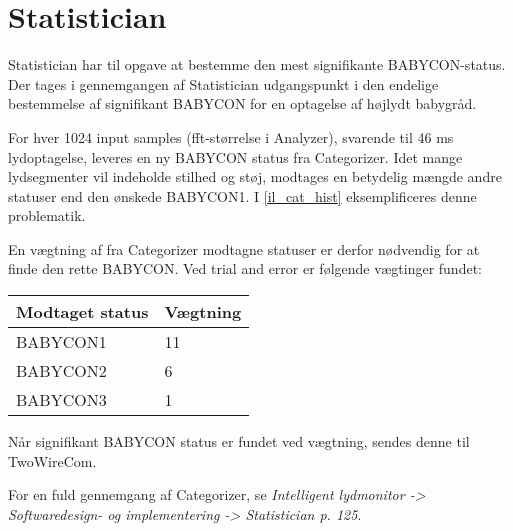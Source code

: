 \section{Statistician}

Statistician har til opgave at bestemme den mest signifikante BABYCON-status. Der tages i gennemgangen af Statistician udgangspunkt i den endelige bestemmelse af signifikant BABYCON for en optagelse af højlydt babygråd.
 
For hver 1024 input samples (fft-størrelse i Analyzer), svarende til 46 ms lydoptagelse, leveres en ny BABYCON status fra Categorizer. Idet mange lydsegmenter vil indeholde stilhed og støj, modtages en betydelig mængde andre statuser end den ønskede BABYCON1. I \ref{il_cat_hist} eksemplificeres denne problematik.


En vægtning af fra Categorizer modtagne statuser er derfor nødvendig for at finde den rette BABYCON. Ved trial and error er følgende vægtinger fundet:
\begin{center}
    \begin{tabular}{ | l | l |}
    \hline
    \textbf{Modtaget status}	& \textbf{Vægtning}		\\ \hline
    BABYCON1							& 11					\\ \hline
    BABYCON2							& 6						\\ \hline
    BABYCON3							& 1						\\ \hline   
    \end{tabular}
\end{center}

Når signifikant BABYCON status er fundet ved vægtning, sendes denne til TwoWireCom.

For en fuld gennemgang af Categorizer, se \textit{Intelligent lydmonitor -> Softwaredesign- og implementering -> Statistician p. 125}.
